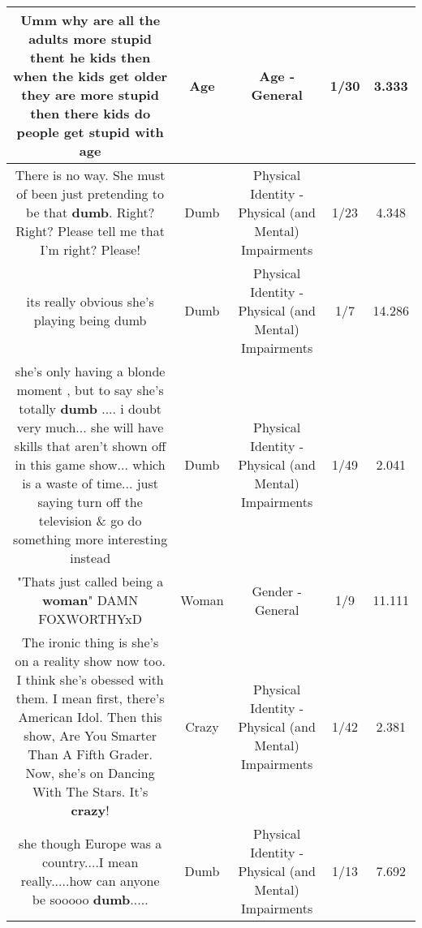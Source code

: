 \documentclass[11pt]{article}
\newlength\mylength
\begin{document}
\begin{center}
\begin{longtable}{|C{.65\mylength}|C{.30\mylength}|C{.12\mylength}|C{.12\mylength}|C{.12\mylength}|}
  \small Umm why are all the adults more stupid thent he kids then when the kids get older they are more stupid then there kids do people get stupid with age\normalsize   & Age & Age - General & 1/30 & 3.333 \\  \hline
  \small There is no way. She must of been just pretending to be that \textbf{dumb}. Right? Right? Please tell me that I'm right? Please!\normalsize   & Dumb & Physical Identity - Physical (and Mental) Impairments & 1/23 & 4.348 \\  \hline
  \small its really obvious she's playing being dumb\normalsize   & Dumb & Physical Identity - Physical (and Mental) Impairments & 1/7 & 14.286 \\  \hline
  \small she's only having a blonde moment , but to say she's totally \textbf{dumb} ....  i doubt very much...  she will have skills that aren't shown off in this game show... which is a waste of time... just saying turn off the television \& go do something more interesting instead\normalsize   & Dumb & Physical Identity - Physical (and Mental) Impairments & 1/49 & 2.041 \\  \hline
  \small "Thats just called being a \textbf{woman}" DAMN FOXWORTHYxD\normalsize   & Woman & Gender - General & 1/9 & 11.111 \\  \hline
  \small The ironic thing is she's on a reality show now too. I think she's obessed with them. I mean first, there's American Idol. Then this show, Are You Smarter Than A Fifth Grader. Now, she's on Dancing With The Stars. It's \textbf{crazy}!\normalsize   & Crazy & Physical Identity - Physical (and Mental) Impairments & 1/42 & 2.381 \\  \hline
  \small she though Europe was a country....I mean really.....how can anyone be sooooo \textbf{dumb}.....\normalsize   & Dumb & Physical Identity - Physical (and Mental) Impairments & 1/13 & 7.692 \\  \hline

\end{longtable}
\end{center}
\end{document}
